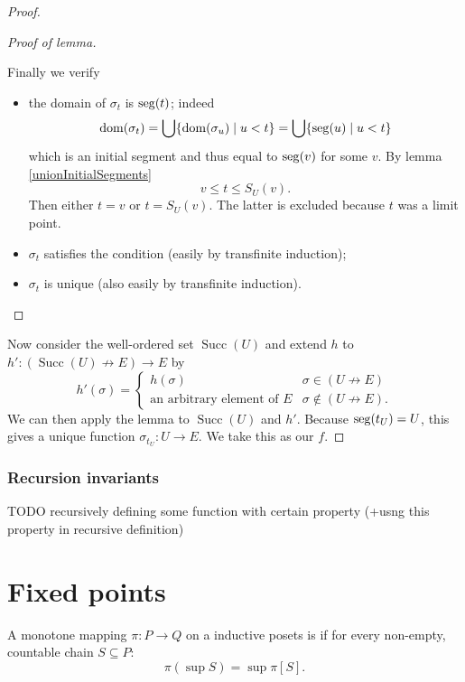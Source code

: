 \begin{proof}
\begin{proof}[Proof of lemma]
\begin{itemize}[leftmargin=2.5cm]
Finally we verify
\begin{itemize}
\item the domain of $\sigma_t$ is $\operatorname{seg}(t)$; indeed
\[ \operatorname{dom}(\sigma_t) = \bigcup\{\operatorname{dom}(\sigma_u)\;|\; u< t \} = \bigcup\{ \operatorname{seg}(u)\;|\; u<t \} \]
which is an initial segment and thus equal to $\operatorname{seg}(v)$ for some $v$. By lemma \ref{unionInitialSegments}
\[ v\leq t \leq S_U(v). \]
Then either $t=v$ or $t=S_U(v)$. The latter is excluded because $t$ was a limit point.
\item $\sigma_t$ satisfies the condition (easily by transfinite induction);
\item $\sigma_t$ is unique (also easily by transfinite induction).
\end{itemize}
\end{itemize}
\end{proof}

Now consider the well-ordered set $\operatorname{Succ}(U)$ and extend $h$ to $h': (\operatorname{Succ}(U)\not\to E) \to E$ by
\[ h'(\sigma) = \begin{cases}
h(\sigma) & \sigma\in (U\not\to E) \\
\text{an arbitrary element of $E$} & \sigma \notin (U\not\to E).
\end{cases} \]
We can then apply the lemma to $\operatorname{Succ}(U)$ and $h'$. Because $\operatorname{seg}(t_U) = U$, this gives a unique function $\sigma_{t_U}: U\to E$. We take this as our $f$.
\end{proof}

\subsection{Recursion invariants}
TODO recursively defining some function with certain property (+usng this property in recursive definition)


\chapter{Fixed points}

\begin{definition}
A monotone mapping $\pi : P \to Q$ on a inductive posets
 is  if for every non-empty, countable chain $S\subseteq P$:
 \[ \pi(\sup S) = \sup\pi[S]. \]
\end{definition}

